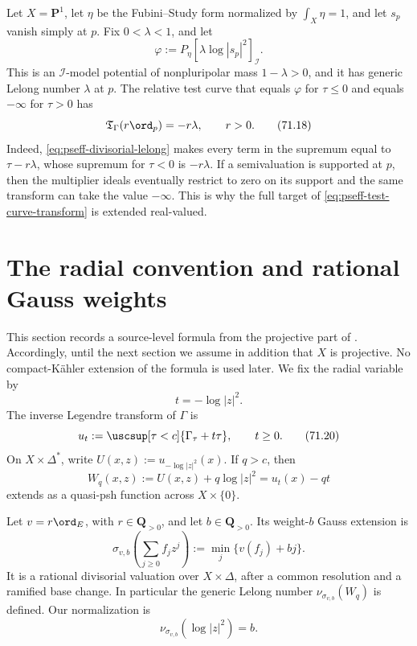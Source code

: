 \begin{example}
Let \(X=\mathbf P^1\), let \(\eta\) be the Fubini--Study form normalized
by \(\int_X\eta=1\), and let \(s_p\) vanish simply at \(p\).  Fix
\(0<\lambda<1\), and let
\[
 \varphi:=P_\eta[\lambda\log|s_p|^2]_{\mathcal I}.
\tag{71.17}\label{eq:pseff-log-pole-potential}
\]
This is an \(\mathcal I\)-model potential of nonpluripolar mass
\(1-\lambda>0\), and it has generic Lelong number \(\lambda\) at \(p\).
The relative test curve that equals \(\varphi\) for \(\tau\leq0\) and
equals \(-\infty\) for \(\tau>0\) has
\[
 \mathfrak T_\Gamma(r\ord_p)=-r\lambda,
 \qquad r>0.
\tag{71.18}\label{eq:pseff-log-pole-transform}
\]
Indeed, \eqref{eq:pseff-divisorial-lelong} makes every term in the
supremum equal to \(\tau-r\lambda\), whose supremum for \(\tau<0\) is
\(-r\lambda\).  If a semivaluation is supported at \(p\), then the
multiplier ideals eventually restrict to zero on its support and the same
transform can take the value \(-\infty\).  This is why the full target of
\eqref{eq:pseff-test-curve-transform} is extended real-valued.
\end{example}

\section{The radial convention and rational Gauss weights}

This section records a source-level formula from the projective part of
\cite{DXZ23}.  Accordingly, until the next section we assume in addition
that \(X\) is projective.  No compact-K\"ahler extension of the formula is
used later.  We fix the radial variable by
\[
                         t=-\log|z|^2.
\tag{71.19}\label{eq:pseff-radial-convention}
\]
The inverse Legendre transform of \(\Gamma\) is
\[
 u_t:=\uscsup[\tau<c]\{\Gamma_\tau+t\tau\},
 \qquad t\geq0.
\tag{71.20}\label{eq:pseff-inverse-legendre}
\]
On \(X\times\Delta^*\), write
\(U(x,z):=u_{-\log|z|^2}(x)\).  If \(q>c\), then
\[
 W_q(x,z):=U(x,z)+q\log|z|^2
          =u_t(x)-qt
\tag{71.21}\label{eq:pseff-shifted-radial-potential}
\]
extends as a quasi-psh function across \(X\times\{0\}\).

Let \(v=r\ord_E\), with \(r\in\mathbf Q_{>0}\), and let
\(b\in\mathbf Q_{>0}\).  Its weight-\(b\) Gauss extension is
\[
 \sigma_{v,b}\!\left(\sum_{j\geq0}f_jz^j\right)
 :=\min_j\{v(f_j)+bj\}.
\tag{71.22}\label{eq:pseff-weighted-gauss}
\]
It is a rational divisorial valuation over \(X\times\Delta\), after a
common resolution and a ramified base change.  In particular the generic
Lelong number \(\nu_{\sigma_{v,b}}(W_q)\) is defined.  Our normalization is
\[
                  \nu_{\sigma_{v,b}}(\log|z|^2)=b.
\tag{71.23}\label{eq:pseff-gauss-log-normalization}
\]

